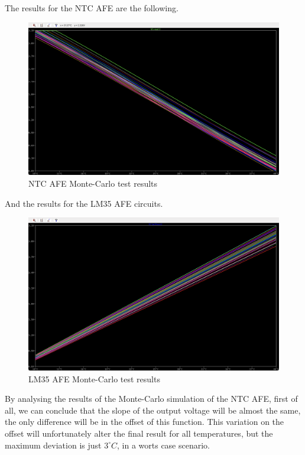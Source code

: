 \documentclass[12pt]{article}
\begin{document}
    The results for the NTC AFE are the following.

    \begin{figure}[H]
        \centering
        \includegraphics*[scale = 0.3]{images/montecarlo ntc.png}
        \caption{NTC AFE Monte-Carlo test results}
        \label{montecarlontc}
    \end{figure}

    And the results for the LM35 AFE circuits.

    \begin{figure}[H]
        \centering
        \includegraphics*[scale = 0.3]{images/montecarlo lm35.png}
        \caption{LM35 AFE Monte-Carlo test results}
        \label{montecarlolm}
    \end{figure}

    By analysing the results of the Monte-Carlo simulation of the NTC AFE, first of all, we can conclude that the
    slope of the output voltage will be almost the same, the only difference will be in the offset of this function.
    This variation on the offset will unfortunately alter the final result for all temperatures, but the maximum deviation is just  $3^\circ C$, in a worts case scenario.
\end{document}
